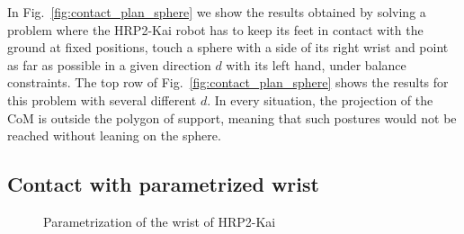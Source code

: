 In Fig.~\ref{fig:contact_plan_sphere} we show the results obtained by solving a problem where the HRP2-Kai robot has to keep its feet in contact with the ground at fixed positions, touch a sphere with a side of its right wrist and point as far as possible in a given direction $d$ with its left hand, under balance constraints.
The top row of Fig.~\ref{fig:contact_plan_sphere} shows the results for this problem with several different $d$.
In every situation, the projection of the CoM is outside the polygon of support, meaning that such postures would not be reached without leaning on the sphere.

\subsection{Contact with parametrized wrist}

\begin{figure}[!htb]
\centering
  \centering
  \setlength\fboxsep{0pt}
  \setlength\fboxrule{1pt}
\caption{Parametrization of the wrist of HRP2-Kai}
\label{fig:param_wrist_detail}
\end{figure}

